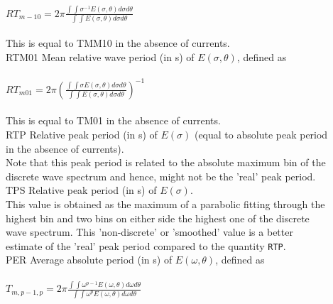 \documentclass[12pt]{book}
\begin{document}
\begin{tabbing}
                     \\
$RT_{m-10} = 2\pi \frac{\int \int \sigma^{-1} E(\sigma, \theta) d\sigma d\theta}{\int \int E(\sigma, \theta) d\sigma d\theta}$ \\
                     \\
                     This is equal to TMM10 in the absence of currents.\-\\
RTM01             \> Mean relative wave period (in s) of $E(\sigma,\theta)$, defined as\+\\
                     \\
$RT_{m01} = 2\pi \left(\frac{\int \int \sigma E(\sigma, \theta) d\sigma d\theta}{\int \int E(\sigma, \theta) d\sigma d\theta} \right)^{-1}$ \\
                        \\
                        This is equal to TM01 in the absence of currents.\-\\
RTP                  \> Relative peak period (in s) of $E(\sigma)$ (equal to absolute peak period\+\\
                        in the absence of currents).\\
                        Note that this peak period is related to the absolute maximum bin of the\\
                        discrete wave spectrum and hence, might not be the 'real' peak period.\-\\
TPS                  \> Relative peak period (in s) of $E(\sigma)$.\+\\
                        This value is obtained as the maximum of a parabolic fitting through the\\
                        highest bin and two bins on either side the highest one of the discrete\\
                        wave spectrum. This 'non-discrete' or 'smoothed' value is a better\\
                        estimate of the 'real' peak period compared to the quantity {\tt RTP}.\-\\
PER                  \> Average absolute period (in s) of $E(\omega,\theta)$, defined as\+\\
                        \\
$T_{m,p-1,p} = 2\pi \frac{\int \int \omega^{p-1} E(\omega, \theta) d\omega d\theta}{\int \int \omega^p E(\omega, \theta) d\omega d\theta}$ \\
                        \\

\end{tabbing}
\end{document}
